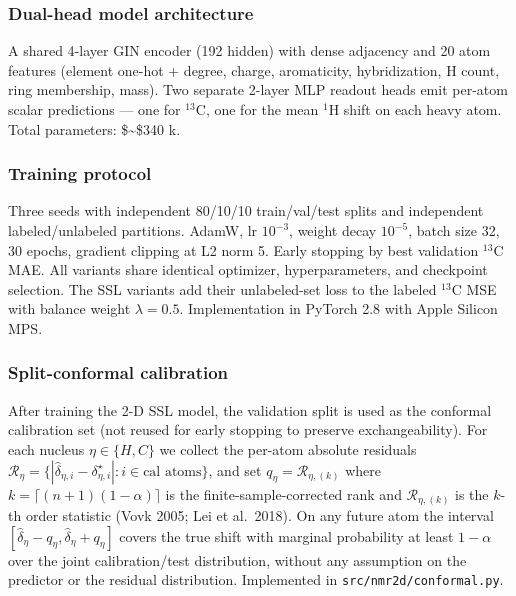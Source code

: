 \subsubsection{Dual-head model architecture}\label{dual-head-model-architecture}

A shared 4-layer GIN encoder (192 hidden) with dense adjacency and 20 atom features (element one-hot + degree, charge, aromaticity, hybridization, H count, ring membership, mass). Two separate 2-layer MLP readout heads emit per-atom scalar predictions --- one for \(^{13}\)C, one for the mean \(^{1}\)H shift on each heavy atom. Total parameters: \$\sim\$340 k.

\subsubsection{Training protocol}\label{training-protocol}

Three seeds with independent 80/10/10 train/val/test splits and independent labeled/unlabeled partitions. AdamW, lr \(10^{-3}\), weight decay \(10^{-5}\), batch size 32, 30 epochs, gradient clipping at L2 norm 5. Early stopping by best validation \(^{13}\)C MAE. All variants share identical optimizer, hyperparameters, and checkpoint selection. The SSL variants add their unlabeled-set loss to the labeled \(^{13}\)C MSE with balance weight \(\lambda = 0.5\). Implementation in PyTorch 2.8 with Apple Silicon MPS.

\subsubsection{Split-conformal calibration}\label{split-conformal-calibration}

After training the 2-D SSL model, the validation split is used as the conformal calibration set (not reused for early stopping to preserve exchangeability). For each nucleus \(\eta \in \{H, C\}\) we collect the per-atom absolute residuals \(\mathcal{R}_\eta = \{|\hat{\delta}_{\eta,i} - \delta^\star_{\eta,i}| : i \in \text{cal atoms}\}\), and set \(q_\eta = \mathcal{R}_{\eta,(k)}\) where \(k = \lceil (n+1)(1-\alpha) \rceil\) is the finite-sample-corrected rank and \(\mathcal{R}_{\eta,(k)}\) is the \(k\)-th order statistic (Vovk 2005; Lei et al.~2018). On any future atom the interval \([\hat{\delta}_\eta - q_\eta, \hat{\delta}_\eta + q_\eta]\) covers the true shift with marginal probability at least \(1 - \alpha\) over the joint calibration/test distribution, without any assumption on the predictor or the residual distribution. Implemented in \texttt{src/nmr2d/conformal.py}.

